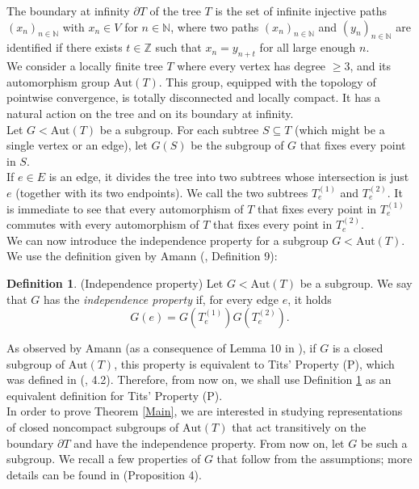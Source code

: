 \documentclass{article}
\theoremstyle{definition}
\newtheorem{dfn}{Definition}[section]
\theoremstyle{remark}
\theoremstyle{plain}
\begin{document}
The boundary at infinity $\partial T$ of the tree $T$ is the set of infinite injective paths $(x_n)_{n\in\mathbb{N}}$ with $x_n\in V$ for $n\in\mathbb{N}$, where two paths $(x_n)_{n\in\mathbb{N}}$ and $(y_n)_{n\in\mathbb{N}}$ are identified if there exists $t\in\mathbb{Z}$ such that $x_n=y_{n+t}$ for all large enough $n$. \\

We consider a locally finite tree $T$ where every vertex has degree $\geq 3$, and its automorphism group $\mathrm{Aut}(T)$. This group, equipped with the topology of pointwise convergence, is totally disconnected and locally compact. It has a natural action on the tree and on its boundary at infinity. \\

Let $G<\mathrm{Aut}(T)$ be a subgroup. For each subtree $S\subseteq T$ (which might be a single vertex or an edge), let $G(S)$ be the subgroup of $G$ that fixes every point in $S$. \\

If $e\in E$ is an edge, it divides the tree into two subtrees whose intersection is just $e$ (together with its two endpoints). We call the two subtrees $T_e^{(1)}$ and $T_e^{(2)}$. It is immediate to see that every automorphism of $T$ that fixes every point in $T_e^{(1)}$ commutes with every automorphism of $T$ that fixes every point in $T_e^{(2)}$. \\

We can now introduce the independence property for a subgroup $G<\mathrm{Aut}(T)$. We use the definition given by Amann (\cite{amann}, Definition 9):

\begin{dfn}{(Independence property)} \label{indpro}
Let $G<\mathrm{Aut}(T)$ be a subgroup. We say that $G$ has the \textit{independence property} if, for every edge $e$, it holds $$G(e)=G(T_e^{(1)})G(T_e^{(2)}).$$
\end{dfn}

As observed by Amann (as a consequence of Lemma 10 in \cite{amann}), if $G$ is a closed subgroup of $\mathrm{Aut}(T)$, this property is equivalent to Tits' Property (P), which was defined in (\cite{tits}, 4.2). Therefore, from now on, we shall use Definition \ref{indpro} as an equivalent definition for Tits' Property (P). \\

In order to prove Theorem \ref{Main}, we are interested in studying representations of closed noncompact subgroups of $\mathrm{Aut}(T)$ that act transitively on the boundary $\partial T$ and have the independence property. From now on, let $G$ be such a subgroup. We recall a few properties of $G$ that follow from the assumptions; more details can be found in \cite{amann} (Proposition 4). \\
\end{document}
